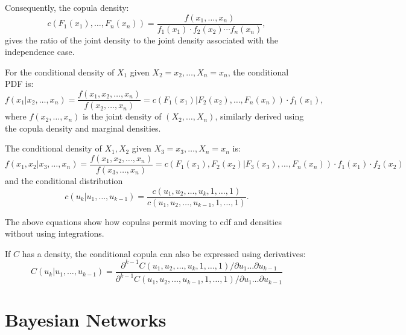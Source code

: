 \documentclass[
	11pt, %
	fleqn, %
	a4paper, %
]{LegrandOrangeBook}
\begin{document}
Consequently, the copula density:
\begin{equation}
c(F_1(x_1),\ldots,F_n(x_n)) = \frac{f(x_1,\ldots, x_n)}{f_1(x_1) \cdot f_2(x_2) \cdots f_n(x_n)},
\label{eq:copuladensity}
\end{equation}
gives the ratio of the joint density to the joint density associated with the independence case.

For the conditional density of $X_1$ given $X_2 = x_2,\ldots,X_n = x_n$, the conditional PDF is:
\begin{equation}
f(x_1|x_2,\ldots, x_n) = \frac{f(x_1, x_2,\ldots, x_n)}{f(x_2,\ldots, x_n)} = c(F_1(x_1)|F_2(x_2),\ldots,F_n(x_n)) \cdot f_1(x_1),
\label{eq:conditionaldensity}
\end{equation}
where $f(x_2,\ldots, x_n)$ is the joint density of $(X_2,\ldots,X_n)$, similarly derived using the copula density and marginal densities.

The conditional density of $X_1, X_2$ given $X_3 = x_3, \ldots, X_n = x_n$ is:
\begin{equation}
f(x_1, x_2| x_3, \ldots, x_n) = \frac{f(x_1, x_2, \ldots, x_n)}{f(x_3, \ldots, x_n)} = c(F_1(x_1), F_2(x_2)| F_3(x_3), \ldots, F_n(x_n)) \cdot f_1(x_1) \cdot f_2(x_2)
\label{eq:conditionaldensity2d}
\end{equation}
and the conditional distribution
\begin{equation}
c(u_k | u_1, \ldots, u_{k-1}) = \frac{c(u_1, u_2, \ldots, u_k, 1, \ldots, 1)}{c(u_1, u_2, \ldots, u_{k-1}, 1, \ldots, 1)}.
\end{equation}

The above equations show how copulas permit moving to cdf and densities without using integrations.

If $C$ has a density, the conditional copula can also be expressed using derivatives:
\begin{equation}
C(u_k | u_1, \ldots, u_{k-1}) = \frac{\partial^{k-1} C(u_1, u_2, \ldots, u_k, 1, \ldots, 1) / \partial u_1 \ldots \partial u_{k-1}}{\partial^{k-1} C(u_1, u_2, \ldots, u_{k-1}, 1, \ldots, 1) / \partial u_1 \ldots \partial u_{k-1}}
\end{equation}



\chapter{Bayesian Networks}






\end{document}
